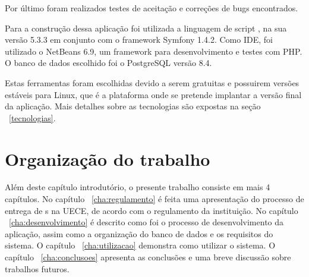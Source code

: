 Por último foram realizados testes de aceitação e correções de bugs encontrados.

Para a construção dessa aplicação foi utilizada a linguagem de script , na 
sua versão 5.3.3 em conjunto com o framework Symfony 1.4.2. Como IDE, foi utilizado 
o NetBeans 6.9, um framework para desenvolvimento e testes com PHP. O 
banco de dados escolhido foi o PostgreSQL versão 8.4.

Estas ferramentas foram escolhidas devido a serem gratuitas e possuirem versões 
estáveis para Linux, que é a plataforma onde se pretende implantar a versão 
final da aplicação. Mais detalhes sobre as tecnologias são expostas na seção ~\ref{tecnologias}.

\section{Organização do trabalho}

Além deste capítulo introdutório, o presente trabalho consiste em mais 4 capítulos. 
No capítulo ~\ref{cha:regulamento} é feita uma apresentação do processo de 
entrega de s na UECE, de acordo
com o regulamento da instituição. No capítulo ~\ref{cha:desenvolvimento} é descrito como foi o processo de desenvolvimento 
da aplicação, assim como a organização do banco de dados e os requisitos do sistema. 
O capítulo ~\ref{cha:utilizacao} demonstra como utilizar o sistema. O capítulo ~\ref{cha:conclusoes} apresenta as conclusões
e uma breve discussão sobre trabalhos futuros.

